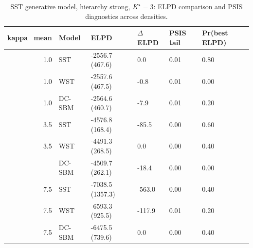 \begin{table}
\centering
\caption{SST generative model, hierarchy strong, $K^\star=3$: ELPD comparison and PSIS diagnostics across densities.}
\centering
\begin{tabular}[t]{rlllll}
\toprule
kappa_mean & Model & ELPD & $\Delta$ELPD & PSIS tail & Pr(best ELPD)\\
\midrule
1.0 & SST & -2556.7 (467.6) & 0.0 & 0.01 & 0.80\\
1.0 & WST & -2557.6 (467.5) & -0.8 & 0.01 & 0.00\\
1.0 & DC-SBM & -2564.6 (460.7) & -7.9 & 0.01 & 0.20\\
3.5 & SST & -4576.8 (168.4) & -85.5 & 0.00 & 0.60\\
3.5 & WST & -4491.3 (268.5) & 0.0 & 0.00 & 0.40\\
\addlinespace
3.5 & DC-SBM & -4509.7 (262.1) & -18.4 & 0.00 & 0.00\\
7.5 & SST & -7038.5 (1357.3) & -563.0 & 0.00 & 0.40\\
7.5 & WST & -6593.3 (925.5) & -117.9 & 0.01 & 0.20\\
7.5 & DC-SBM & -6475.5 (739.6) & 0.0 & 0.00 & 0.40\\
\bottomrule
\end{tabular}
\end{table}
